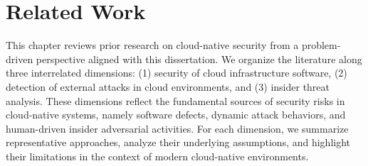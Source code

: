 \chapter{Related Work}
\label{chap:related_work}

This chapter reviews prior research on cloud-native security from a problem-driven perspective aligned with this dissertation. We organize the literature along three interrelated dimensions: (1) security of cloud infrastructure software, (2) detection of external attacks in cloud environments, and (3) insider threat analysis. These dimensions reflect the fundamental sources of security risks in cloud-native systems, namely software defects, dynamic attack behaviors, and human-driven insider adversarial activities. For each dimension, we summarize representative approaches, analyze their underlying assumptions, and highlight their limitations in the context of modern cloud-native environments.